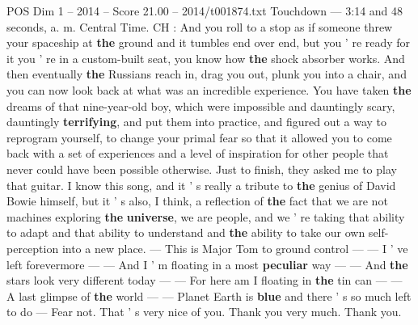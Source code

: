 \begin{textsample}{POS Dim 1 – 2014 – Score 21.00 – 2014/t001874.txt}
Touchdown — 3:14 and 48 seconds, a. m.
Central Time.
CH : And you roll to a stop as if someone threw your spaceship at \textbf{the} ground and it tumbles end over end, but you ' re ready for it you ' re in a custom-built seat, you know how \textbf{the} shock absorber works.
And then eventually \textbf{the} Russians reach in, drag you out, plunk you into a chair, and you can now look back at what was an incredible experience.
You have taken \textbf{the} dreams of that nine-year-old boy, which were impossible and dauntingly scary, dauntingly \textbf{terrifying}, and put them into practice, and figured out a way to reprogram yourself, to change your primal fear so that it allowed you to come back with a set of experiences and a level of inspiration for other people that never could have been possible otherwise.
Just to finish, they asked me to play that guitar.
I know this song, and it ' s really a tribute to \textbf{the} genius of David Bowie himself, but it ' s also, I think, a reflection of \textbf{the} fact that we are not machines exploring \textbf{the} \textbf{universe}, we are people, and we ' re taking that ability to adapt and that ability to understand and \textbf{the} ability to take our own self-perception into a new place. — This is Major Tom to ground control — — I ' ve left forevermore — — And I ' m floating in a most \textbf{peculiar} way — — And \textbf{the} stars look very different today — — For here am I floating in \textbf{the} tin can — — A last glimpse of \textbf{the} world — — Planet Earth is \textbf{blue} and there ' s so much left to do — Fear not.
That ' s very nice of you.
Thank you very much.
Thank you.

\end{textsample}
